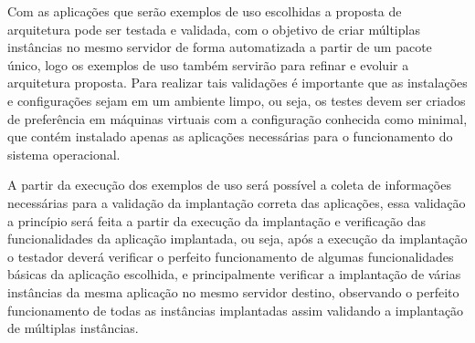 Com as aplicações que serão exemplos de uso escolhidas a proposta de arquitetura
pode ser testada e validada, com o objetivo de criar múltiplas instâncias
no mesmo servidor de forma automatizada a partir de um pacote único, logo os
exemplos de uso também servirão para refinar e evoluir a arquitetura proposta.
Para realizar tais validações é importante que as instalações e configurações
sejam em um ambiente limpo, ou seja, os testes devem ser criados de preferência
em máquinas virtuais com a configuração conhecida como minimal, que contém
instalado apenas as aplicações necessárias para o funcionamento do sistema operacional.

A partir da execução dos exemplos de uso será possível a coleta de informações
necessárias para a validação da implantação correta das aplicações, essa
validação a princípio será feita a partir da execução da implantação e
verificação das funcionalidades da aplicação implantada, ou seja,
após a execução da implantação o testador deverá verificar o perfeito
funcionamento de algumas funcionalidades básicas da aplicação escolhida,
e principalmente verificar a implantação de várias instâncias da mesma
aplicação no mesmo servidor destino, observando o perfeito funcionamento de todas as
instâncias implantadas assim validando a implantação de múltiplas instâncias.
